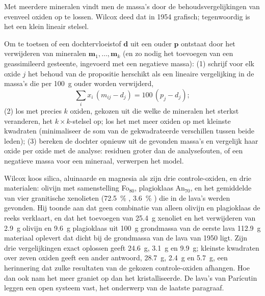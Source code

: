 Met meerdere mineralen vindt men de massa's door de behoudsvergelijkingen van
evenveel oxiden op te lossen. Wilcox deed dat in 1954 grafisch; tegenwoordig is het een klein lineair
stelsel.

\begin{method}\label{met:b2:magmatic-differentiation:massbalance}
Om te toetsen of een dochtervloeistof $\mathbf d$ uit een ouder $\mathbf p$ ontstaat door
het verwijderen van mineralen $\mathbf m_1, \dots, \mathbf m_k$ (en zo nodig het toevoegen van een
geassimileerd gesteente, ingevoerd met een negatieve massa): (1) schrijf voor elk oxide $j$ het
behoud van de propositie herschikt als een lineaire vergelijking in de massa's die
per \qty{100}{g} ouder worden verwijderd,
\[
\sum_i x_i\,(m_{ij} - d_j) = 100\,(p_j - d_j);
\]
(2) los met precies $k$ oxiden, gekozen uit die welke de mineralen het sterkst veranderen, het
$k \times k$-stelsel op; los het met meer oxiden op met kleinste kwadraten (minimaliseer de som
van de gekwadrateerde verschillen tussen beide leden); (3) bereken de dochter opnieuw uit
de gevonden massa's en vergelijk haar oxide per oxide met de analyse: residuen groter
dan de analysefouten, of een negatieve massa voor een mineraal, verwerpen het model.
\end{method}

Wilcox koos silica, aluinaarde en magnesia als zijn drie controle-oxiden, en drie
materialen: olivijn met samenstelling Fo$_{80}$, plagioklaas An$_{70}$, en het gemiddelde
van vier granitische xenolieten (\qty{72.5}{\percent} , \qty{3.6}{\percent}
) die in de lava's werden gevonden. Hij toonde aan dat geen combinatie van alleen olivijn en
plagioklaas de reeks verklaart, en dat het toevoegen van \qty{25.4}{g} xenoliet en het
verwijderen van \qty{2.9}{g} olivijn en \qty{9.6}{g} plagioklaas uit
\qty{100}{g} grondmassa van de eerste lava \qty{112.9}{g} materiaal oplevert dat
dicht bij de grondmassa van de lava van 1950 ligt. Zijn drie vergelijkingen exact oplossen
geeft \qty{24.6}{g}, \qty{3.1}{g} en \qty{9.9}{g}; kleinste kwadraten over zeven oxiden
geeft een ander antwoord, \qty{28.7}{g}, \qty{2.4}{g} en \qty{5.7}{g}, een herinnering
dat zulke resultaten van de gekozen controle-oxiden afhangen. Hoe dan ook nam het  meer
graniet op dan het kristalliseerde. De lava's van Parícutin leggen een open systeem vast, het
onderwerp van de laatste paragraaf.

